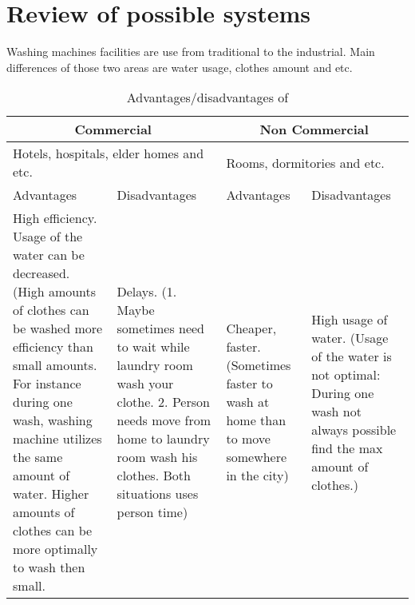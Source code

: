 \section{Review of possible systems}
Washing machines facilities are use from traditional to the industrial. Main differences of those two areas are water usage, clothes amount and etc.

\begin{table}[h]
	\centering
    \begin{tabular}{ | p{3.5cm} | p{3.5cm} | p{3.5cm} | p{3.5cm} |}
    \hline
    \multicolumn{2}{|c|}{\textbf{Commercial}} & \multicolumn{2}{|c|}{\textbf{Non Commercial}} \\ \hline
    \multicolumn{2}{|l|}{Hotels, hospitals, elder homes and etc.} & \multicolumn{2}{|l|}{Rooms, dormitories and etc.} \\ \hline
    Advantages & Disadvantages & Advantages & Disadvantages \\ \hline
    High efficiency. Usage of the water can be decreased. (High amounts of clothes can be washed more efficiency than small amounts. For instance during one wash, washing machine utilizes the same amount of water. Higher amounts of clothes can be more optimally to wash then small. & Delays. (1. Maybe sometimes need to wait while laundry room wash your clothe. 2. Person needs move from home to laundry room wash his clothes. Both situations uses person time) & Cheaper, faster. (Sometimes faster to wash at home than to move somewhere in the city) & High usage of water. (Usage of the water is not optimal: During one wash not always possible find the max amount of clothes.) \\ \hline
    \end{tabular}
	\caption{Advantages/disadvantages of }
	\label{tab:AdDis}
\end{table}
